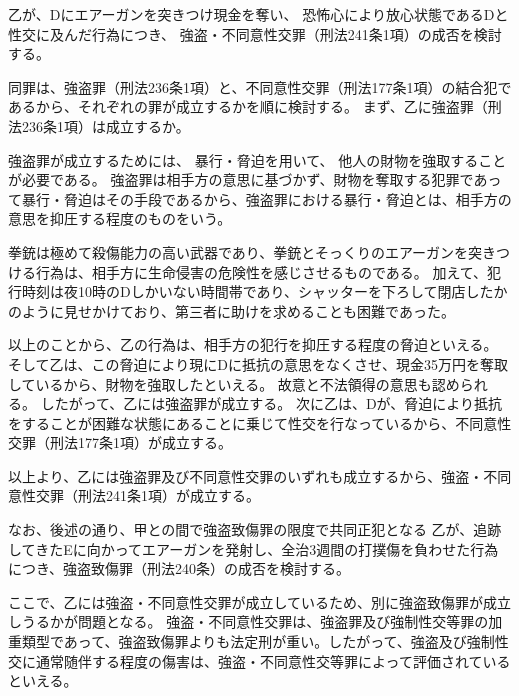 \documentclass[11pt]{jsarticle}
\title{\vspace{-30mm}{\textgt{\Large{\fbox{６} カネ・カネ・キンコ}}}}
\date{\vspace{-15mm}}
\begin{document}
\maketitle

	\sectionB{}
		乙が、Dにエアーガンを突きつけ現金を奪い、
		恐怖心により放心状態であるDと性交に及んだ行為につき、
		強盗・不同意性交罪（刑法241条1項）の成否を検討する。
		
		
		同罪は、強盗罪（刑法236条1項）と、不同意性交罪（刑法177条1項）の結合犯であるから、それぞれの罪が成立するかを順に検討する。
		\sectionC{}
			まず、乙に強盗罪（刑法236条1項）は成立するか。
			
			強盗罪が成立するためには、
			暴行・脅迫を用いて、
			他人の財物を強取することが必要である。
				\sectionD{}
					強盗罪は相手方の意思に基づかず、財物を奪取する犯罪であって暴行・脅迫はその手段であるから、強盗罪における暴行・脅迫とは、相手方の意思を抑圧する程度のものをいう。
					
					
					拳銃は極めて殺傷能力の高い武器であり、拳銃とそっくりのエアーガンを突きつける行為は、相手方に生命侵害の危険性を感じさせるものである。
					加えて、犯行時刻は夜10時のDしかいない時間帯であり、シャッターを下ろして閉店したかのように見せかけており、第三者に助けを求めることも困難であった。
					
					以上のことから、乙の行為は、相手方の犯行を抑圧する程度の脅迫といえる。
				\sectionD{}
					そして乙は、この脅迫により現にDに抵抗の意思をなくさせ、現金35万円を奪取しているから、財物を強取したといえる。
				\sectionD{}
					故意と不法領得の意思も認められる。
					したがって、乙には強盗罪が成立する。
		\sectionC{}
			次に乙は、Dが、脅迫により抵抗をすることが困難な状態にあることに乗じて性交を行なっているから、不同意性交罪（刑法177条1項）が成立する。
			
		\sectionC{}
			以上より、乙には強盗罪及び不同意性交罪のいずれも成立するから、強盗・不同意性交罪（刑法241条1項）が成立する。
			
			なお、後述の通り、甲との間で強盗致傷罪の限度で共同正犯となる
	\sectionB{}
		乙が、追跡してきたEに向かってエアーガンを発射し、全治3週間の打撲傷を負わせた行為につき、強盗致傷罪（刑法240条）の成否を検討する。
		
		ここで、乙には強盗・不同意性交罪が成立しているため、別に強盗致傷罪が成立しうるかが問題となる。
		強盗・不同意性交罪は、強盗罪及び強制性交等罪の加重類型であって、強盗致傷罪よりも法定刑が重い。したがって、強盗及び強制性交に通常随伴する程度の傷害は、強盗・不同意性交等罪によって評価されているといえる。
		
\end{document}

